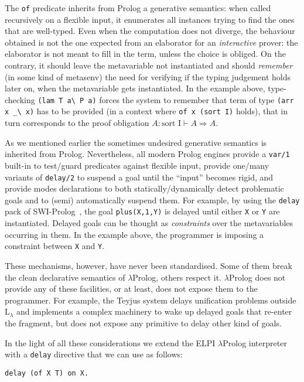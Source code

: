 \documentclass{easychair}
\begin{document}
The \verb+of+ predicate inherits from Prolog a generative semantics:
when called recursively on a flexible input, it enumerates all
instances trying to find the ones that are well-typed. Even when 
the computation does not diverge, the behaviour obtained is not the one
expected from an elaborator for an \emph{interactive} prover: the
elaborator is not meant to fill in the term, unless the choice is
obliged. On the contrary, it should leave the metavariable not
instantiated and should \emph{remember} (in some kind of metasenv) the need for verifying if the
typing judgement holds later on, when the metavariable gets instantiated. In
the example above, type-checking \verb+(lam T a\ P a)+ forces the
system to remember that term of type \verb+(arr x _\ x)+ has to be
provided (in a context where \verb+of x (sort I)+ holds), that in turn
corresponds to the proof obligation $A : \mbox{sort I} \vdash A \Rightarrow A $.

As we mentioned earlier the sometimes undesired generative semantics
is inherited from Prolog.
Nevertheless, all modern Prolog engines provide a \verb+var/1+
built-in to test/guard predicates against flexible input, provide
one/many variants of \verb+delay/2+ to suspend a goal until the ``input''
becomes rigid, and provide modes declarations to both
statically/dynamically detect problematic goals and to (semi)
automatically suspend them.
For example, by using the \verb+delay+ pack of SWI-Prolog~\cite{SWI}, the goal
\verb+plus(X,1,Y)+ is delayed until either \verb+X+ or \verb+Y+ are
instantiated.  Delayed goals can be thought as \emph{constraints} over the
metavariables occurring in them. In the example above, the programmer is
imposing a constraint between \verb+X+ and \verb+Y+.

These mechanisms, however, have never been standardised. Some of them
break the clean declarative semantics of $\lambda$Prolog, others
respect it. $\lambda$Prolog does not provide any of these facilities,
or at least, does not expose them to the programmer. For example, the Teyjus
system delays unification problems outside L$_\lambda$ and implements a complex
machinery to wake up delayed goals that re-enter the fragment, but does not
expose any primitive to delay other kind of goals.

In the light of all these considerations we extend the ELPI
$\lambda$Prolog interpreter with a \verb+delay+ directive that we can use
as follows:

\begin{Verbatim}
delay (of X T) on X.
\end{Verbatim}
\end{document}
